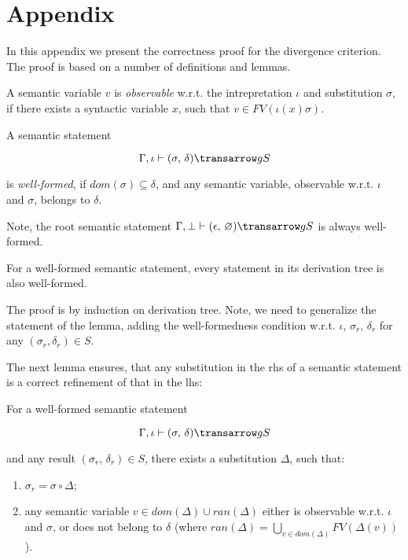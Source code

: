 \section{Appendix}
\label{appendix}

In this appendix we present the correctness proof for the divergence criterion.
The proof is based on a number of definitions and lemmas.

\begin{definition}
\normalfont
A semantic variable $v$ is \emph{observable} w.r.t. the intrepretation $\iota$ and substitution $\sigma$, if there exists 
a syntactic variable $x$, such that \mbox{$v \in FV(\iota(x) \sigma)$}.
\end{definition}

\begin{definition}
\normalfont
A semantic statement 

$$
\otrans{\Gamma,\iota}{(\sigma,\,\delta)}{g}{S}
$$ 

\noindent is \emph{well-formed}, if \mbox{$dom(\sigma) \subseteq \delta$}, and any semantic variable, observable w.r.t. $\iota$ and $\sigma$, belongs to $\delta$.  
\end{definition}

Note, the root semantic statement \mbox{$\otrans{\Gamma,\bot}{(\epsilon,\,\emptyset)}{g}{S}$} is always well-formed.

\begin{lemma}
\label{one}
\normalfont
 For a well-formed semantic statement, every statement in its derivation tree is also well-formed.
\end{lemma}

The proof is by induction on derivation tree. Note, we need to generalize the statement of the lemma, adding the well-formedness
condition w.r.t. $\iota$, $\sigma_r$, $\delta_r$ for any $(\sigma_r, \delta_r) \in S$.

The next lemma ensures, that any substitution in the rhs of a semantic statement is a correct refinement of that in the lhs:

\begin{lemma}
\label{two}
\normalfont
For a well-formed semantic statement 

$$
\otrans{\Gamma,\iota}{(\sigma,\,\delta)}{g}{S}
$$ 

\noindent and any result \mbox{$(\sigma_r,\,\delta_r) \in S$}, there exists a substitution $\Delta$, such that:
  \begin{enumerate}
    \item \mbox{$\sigma_r = \sigma\circ\Delta$};
    \item any semantic variable \mbox{$v\in dom(\Delta)\cup ran(\Delta)$} either is observable w.r.t. $\iota$ and $\sigma$,
 or does not belong to $\delta$ (where \mbox{$ran(\Delta)=\bigcup_{v\in dom(\Delta)}FV(\Delta(v))$}).
  \end{enumerate}   
\end{lemma}

